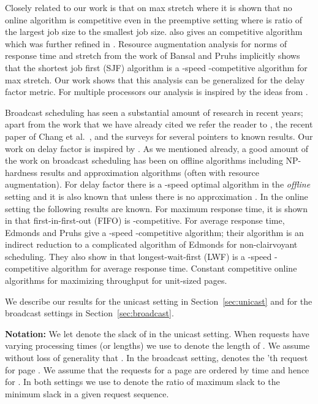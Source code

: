 \documentclass[11pt]{article}
\newcommand{\etal}{et al.\ }
\begin{document}
Closely related to our work is that on max stretch \cite{BenderCM98}
where it is shown that no online algorithm is  competitive
even in the preemptive setting where  is ratio of the largest job
size to the smallest job size. \cite{BenderCM98} also gives an
 competitive algorithm which was further refined in
\cite{BenderMR02}. Resource augmentation analysis for  norms of
response time and stretch from the work of Bansal and Pruhs
\cite{BansalP03} implicitly shows that the shortest job first (SJF)
algorithm is a -speed -competitive algorithm for
max stretch. Our work shows that this analysis can be generalized for
the delay factor metric. For multiple processors our analysis is
inspired by the ideas from \cite{AvrahamiA03,ChekuriGKK04}.

Broadcast scheduling has seen a substantial amount of research in
recent years; apart from the work that we have already cited we refer
the reader to \cite{CharikarK06,KhullerK04}, the recent paper of Chang
\etal \cite{ChangEGK08}, and the surveys \cite{PruhsST,Pruhs07} for
several pointers to known results. Our work on delay factor is
inspired by \cite{ChangEGK08}.  As we mentioned already, a good
amount of the work on broadcast scheduling has been on offline
algorithms including NP-hardness results and approximation algorithms
(often with resource augmentation). For delay factor there is a
-speed optimal algorithm in the {\em offline} setting and it is
also known that unless  there is no  approximation
\cite{ChangEGK08}. In the online setting the following results are
known.  For maximum response time, it is shown in
\cite{BartalM00,ChangEGK08} that first-in-first-out (FIFO) is
-competitive.  For average response time,
Edmonds and Pruhs \cite{EdmondsP03} give a -speed
-competitive algorithm; their algorithm is an indirect
reduction to a complicated algorithm of Edmonds \cite{Edmonds00} for
non-clairvoyant scheduling. They also show in \cite{EdmondsP04} that
longest-wait-first (LWF) is a -speed -competitive algorithm
for average response time.  Constant competitive online
algorithms for maximizing throughput
\cite{Kimc04,ChanLTW04,ZhengFCCPW06,ChrobakDJKK06} for unit-sized
pages.

\medskip
\noindent
We describe our results for the unicast setting
in Section~\ref{sec:unicast} and for the broadcast settings in
Section~\ref{sec:broadcast}.

\medskip
\noindent
{\bf Notation:}
We let  denote the slack of  in the unicast
setting. When requests have varying processing times (or lengths) we
use  to denote the length of . We assume without loss
of generality that .
In the broadcast setting,  denotes the 'th request for
page . We assume that the requests for a page are ordered by time
and hence  for .
In both settings we use  to denote the ratio of maximum slack
to the minimum slack in a given request sequence.
\end{document}
